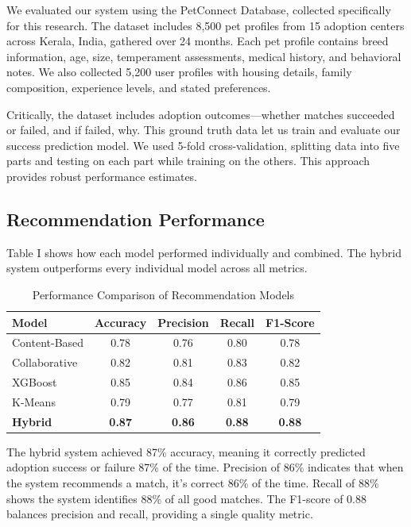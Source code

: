 \documentclass[conference]{IEEEtran}
\begin{document}
We evaluated our system using the PetConnect Database, collected specifically for this research. The dataset includes 8,500 pet profiles from 15 adoption centers across Kerala, India, gathered over 24 months. Each pet profile contains breed information, age, size, temperament assessments, medical history, and behavioral notes. We also collected 5,200 user profiles with housing details, family composition, experience levels, and stated preferences.

Critically, the dataset includes adoption outcomes—whether matches succeeded or failed, and if failed, why. This ground truth data let us train and evaluate our success prediction model. We used 5-fold cross-validation, splitting data into five parts and testing on each part while training on the others. This approach provides robust performance estimates.

\subsection{Recommendation Performance}

Table I shows how each model performed individually and combined. The hybrid system outperforms every individual model across all metrics.

\begin{table}[htbp]
\caption{Performance Comparison of Recommendation Models}
\begin{center}
\begin{tabular}{|l|c|c|c|c|}
\hline
\textbf{Model} & \textbf{Accuracy} & \textbf{Precision} & \textbf{Recall} & \textbf{F1-Score} \\
\hline
Content-Based & 0.78 & 0.76 & 0.80 & 0.78 \\
Collaborative & 0.82 & 0.81 & 0.83 & 0.82 \\
XGBoost & 0.85 & 0.84 & 0.86 & 0.85 \\
K-Means & 0.79 & 0.77 & 0.81 & 0.79 \\
\hline
\textbf{Hybrid} & \textbf{0.87} & \textbf{0.86} & \textbf{0.88} & \textbf{0.88} \\
\hline
\end{tabular}
\end{center}
\end{table}

The hybrid system achieved 87\% accuracy, meaning it correctly predicted adoption success or failure 87\% of the time. Precision of 86\% indicates that when the system recommends a match, it's correct 86\% of the time. Recall of 88\% shows the system identifies 88\% of all good matches. The F1-score of 0.88 balances precision and recall, providing a single quality metric.
\end{document}
